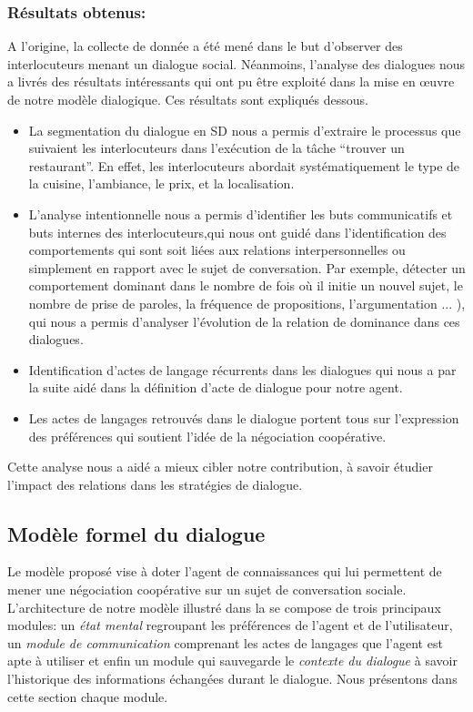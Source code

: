 \documentclass[a4paper,french]{article}
\begin{document}
\subsubsection{Résultats obtenus:}
\par A l'origine, la collecte de donnée a été mené dans le but d'observer des interlocuteurs menant un dialogue social. Néanmoins, l'analyse des dialogues nous a livrés des résultats intéressants qui ont pu être exploité dans la mise en œuvre de notre modèle dialogique.  Ces résultats sont expliqués dessous.

\begin{itemize}

		\item  La segmentation du dialogue en SD nous a permis d'extraire le processus que suivaient les interlocuteurs dans l'exécution de la tâche  ``trouver un restaurant''. En effet, les interlocuteurs abordait systématiquement le type de la cuisine, l'ambiance, le prix, et la localisation. 
		
		\item L'analyse intentionnelle nous a permis d'identifier les buts communicatifs et buts internes des interlocuteurs,qui nous ont guidé dans l'identification des comportements qui sont soit liées aux relations interpersonnelles ou simplement en rapport avec le sujet de conversation. Par exemple, détecter un comportement dominant dans le nombre de fois où il initie un nouvel sujet, le nombre de prise de paroles, la fréquence de propositions, l'argumentation ... ), qui nous a permis d'analyser l'évolution de la relation de dominance dans ces dialogues. 
		\item Identification d'actes de langage récurrents dans les dialogues qui nous a par la suite aidé dans la définition d'acte de dialogue pour notre agent.	
		\item Les actes de langages retrouvés dans le dialogue portent tous sur l'expression des préférences qui soutient l'idée de la négociation coopérative.
	
\end{itemize}

\par Cette analyse nous a aidé a mieux cibler notre contribution, à savoir étudier l'impact des relations dans les stratégies de dialogue.

	
	
\subsection{Modèle formel du dialogue}
\par Le modèle proposé vise à doter l'agent de connaissances qui lui permettent de mener une négociation coopérative sur un sujet de conversation sociale. L'architecture de notre modèle illustré dans la  se compose de trois principaux modules: un \textit{état mental} regroupant les préférences de l'agent et de l'utilisateur, un \textit{module de communication} comprenant les actes de langages que l'agent est apte à utiliser et enfin un module qui sauvegarde le \textit{contexte du dialogue} à savoir l'historique des informations échangées durant le dialogue. Nous présentons dans cette section chaque module.
\end{document}

